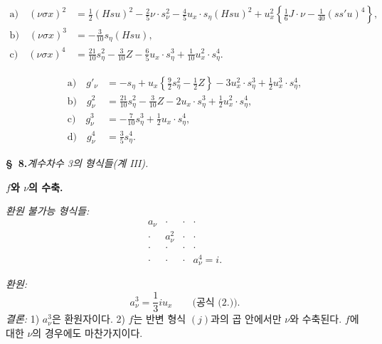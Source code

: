 \[
\tag{7.}
\begin{aligned}
\text{a)}\quad (\nu\sigma x)^2
&=\frac12(Hsu)^2-\frac25\nu\cdot s_\nu^2-\frac45u_x\cdot s_\eta(Hsu)^2+u_x^2\left\{\frac16J\cdot\nu-\frac1{40}(ss'u)^4\right\},\\
\text{b)}\quad (\nu\sigma x)^3&=-\frac3{10}s_\eta(Hsu),\\
\text{c)}\quad (\nu\sigma x)^4&=\frac{21}{10}s_\eta^2-\frac3{10}Z-\frac65u_x\cdot s_\eta^3+\frac1{10}u_x^2\cdot s_\eta^4.
\end{aligned}
\]

\[
\tag{8.}
\begin{aligned}
\text{a)}\quad g'_\nu&=-s_\eta+u_x\left\{\frac92s_\eta^2-\frac12Z\right\}-3u_x^2\cdot s_\eta^3+\frac12u_x^3\cdot s_\eta^4,\\
\text{b)}\quad g_\nu^2&=\frac{21}{10}s_\eta^2-\frac3{10}Z-2u_x\cdot s_\eta^3+\frac12u_x^2\cdot s_\eta^4,\\
\text{c)}\quad g_\nu^3&=-\frac7{10}s_\eta^3+\frac12u_x\cdot s_\eta^4,\\
\text{d)}\quad g_\nu^4&=\frac35s_\eta^4.
\end{aligned}
\]

\begin{center}
\textbf{\S\ 8.}\quad\emph{계수차수 3의 형식들(계 III).}
\end{center}

\noindent\textbf{$f$와 $\nu$의 수축.}

\noindent\emph{환원 불가능 형식들:}
\[
\begin{array}{cccc}
a_\nu&\cdot&\cdot&\cdot\\
\cdot&a_\nu^2&\cdot&\cdot\\
\cdot&\cdot&\cdot&\cdot\\
\cdot&\cdot&\cdot&a_\nu^4=i.
\end{array}
\]

\noindent\emph{환원:}
\[
a_\nu^3=\frac13iu_x\qquad\text{(공식 (2.)).}
\]
\noindent\emph{결론:} 1) $a_\nu^3$은 환원자이다. 2) $f$는 반변 형식 $(j)$과의 곱 안에서만 $\nu$와 수축된다. $f$에 대한 $\nu$의 경우에도 마찬가지이다.

